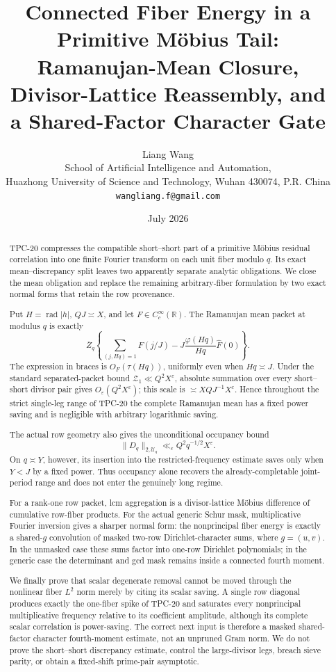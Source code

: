 \documentclass[11pt]{article}
\title{\textbf{Connected Fiber Energy in a Primitive M\"obius Tail:}\\
\textbf{Ramanujan-Mean Closure,}\\
\textbf{Divisor-Lattice Reassembly, and}\\
\textbf{a Shared-Factor Character Gate}}
\author{Liang Wang\\
\small School of Artificial Intelligence and Automation,\\[-0.2em]
\small Huazhong University of Science and Technology, Wuhan 430074, P.R. China\\
\small \texttt{wangliang.f@gmail.com}}
\date{July 2026}
\theoremstyle{definition}
\theoremstyle{remark}
\newcommand{\R}{\mathbb R}
\newcommand{\eps}{\varepsilon}
\newcommand{\cU}{\mathcal U}
\newcommand{\rad}{\operatorname{rad}}
\begin{document}
\maketitle

\begin{abstract}
TPC-20 compresses the compatible short--short part of a primitive
M\"obius residual correlation into one finite Fourier transform on each
unit fiber modulo \(q\).  Its exact mean--discrepancy split leaves two
apparently separate analytic obligations.  We close the mean obligation
and replace the remaining arbitrary-fiber formulation by two exact
normal forms that retain the row provenance.

Put \(H=\rad|h|\), \(QJ\asymp X\), and let \(F\in C_c^\infty(\R)\).
The Ramanujan mean packet at modulus \(q\) is exactly
\[
 \overline Z_q\left\{
 \sum_{(j,Hq)=1}F(j/J)
 -J\frac{\varphi(Hq)}{Hq}\widehat F(0)\right\}.
\]
The expression in braces is \(O_F(\tau(Hq))\), uniformly even when
\(Hq\asymp J\).  Under the standard separated-packet bound
\(\mathcal Z_1\ll Q^2X^\eps\), absolute summation over every short--short
divisor pair gives \(O_\eps(Q^2X^\eps)\); this scale is
\(\asymp XQJ^{-1}X^\eps\).  Hence throughout
the strict single-leg range of TPC-20 the complete Ramanujan mean has a
fixed power saving and is negligible with arbitrary logarithmic saving.

The actual row geometry also gives the unconditional occupancy bound
\[
 \lVert D_q\rVert_{2,\cU_q}\ll_\eps Q^2q^{-1/2}X^\eps.
\]
On \(q\asymp Y\), however, its insertion into the restricted-frequency
estimate saves only when \(Y<J\) by a fixed power.  Thus occupancy alone
recovers the already-completable joint-period range and does not enter
the genuinely long regime.

For a rank-one row packet, lcm aggregation is a divisor-lattice M\"obius
difference of cumulative row-fiber products.  For the actual generic
Schur mask, multiplicative Fourier inversion gives a sharper normal
form: the nonprincipal fiber energy is exactly a shared-\(g\) convolution
of masked two-row Dirichlet-character sums, where \(g=(u,v)\).  In the
unmasked case these sums factor into one-row Dirichlet polynomials; in
the generic case the determinant and gcd mask remains inside a connected
fourth moment.

We finally prove that scalar degenerate removal cannot be moved through
the nonlinear fiber \(L^2\) norm merely by citing its scalar saving.  A
single row diagonal produces exactly the one-fiber spike of TPC-20 and
saturates every nonprincipal multiplicative frequency relative to its
coefficient amplitude, although its complete scalar correlation is
power-saving.  The correct next input is therefore a masked shared-factor
character fourth-moment estimate, not an unpruned Gram norm.  We do not
prove the short--short
discrepancy estimate, control the large-divisor legs, breach sieve parity,
or obtain a fixed-shift prime-pair asymptotic.
\end{abstract}
\end{document}
